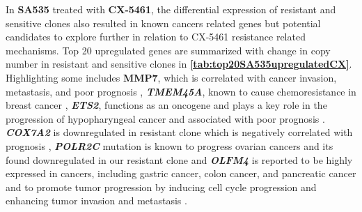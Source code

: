 
In \textbf{SA535} treated with \textbf{CX-5461}, the differential expression of resistant and sensitive clones also resulted in known cancers related genes but potential candidates to explore further in relation to CX-5461 resistance related mechanisms. Top 20 upregulated genes are summarized with change in copy number in resistant and sensitive clones in \textbf{\autoref{tab:top20SA535upregulatedCX}}.
Highlighting some  includes \textbf{MMP7}, which is correlated with cancer invasion, metastasis, and poor prognosis \cite{mcgowan2008matrix} ,
\textit{\textbf{TMEM45A}}, known to cause chemoresistance in breast cancer \cite{schmit2019characterization},
\textit{\textbf{ETS2}}, functions as an oncogene and plays a key role in the progression of hypopharyngeal cancer and associated with poor prognosis \cite{fu2017high, ge2008role}.
\textit{\textbf{COX7A2}} is downregulated in resistant clone which is negatively correlated with prognosis \cite{deng2018overexpression},
\textit{\textbf{POLR2C}} mutation is known to progress ovarian cancers and its found downregulated in our resistant clone \cite {moriwaki2017polr2c} and
\textit{\textbf{OLFM4}} is reported to be highly expressed in cancers, including gastric cancer, colon cancer, and pancreatic cancer and to promote tumor progression by inducing cell cycle progression and enhancing tumor invasion and metastasis \cite{ashizawa2019olfm4}.


